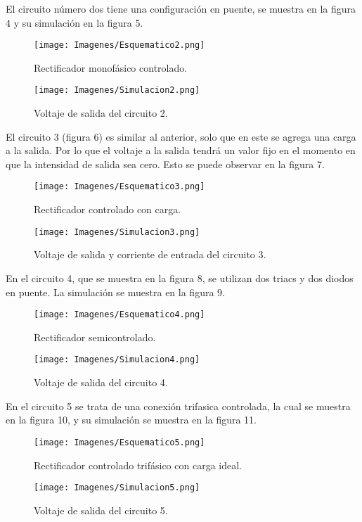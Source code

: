 \documentclass[letterpaper]{article}
\begin{document}
\newpage
El circuito número dos tiene una configuración en puente, se muestra en la figura 4 y su simulación en la figura 5.
\begin{figure}[ht]
    \centering
    \texttt{[image: Imagenes/Esquematico2.png]}
    \caption{Rectificador monofásico controlado.}
    \label{fig:my_label2}
\end{figure}
\begin{figure}[ht]
    \centering
    \texttt{[image: Imagenes/Simulacion2.png]}
    \caption{Voltaje de salida del circuito 2.}
    \label{fig:my_label3}
\end{figure}

\newpage
El circuito 3 (figura 6) es similar al anterior, solo que en este se agrega una carga a la salida. Por lo que el voltaje a la salida tendrá un valor fijo en el momento en que la intensidad de salida sea cero. Esto se puede observar en la figura 7.
\begin{figure}[ht]
    \centering
    \texttt{[image: Imagenes/Esquematico3.png]}
    \caption{Rectificador controlado con carga.}
    \label{fig:my_label4}
\end{figure}
\begin{figure}[ht]
    \centering
    \texttt{[image: Imagenes/Simulacion3.png]}
    \caption{Voltaje de salida y corriente de entrada del circuito 3.}
    \label{fig:my_label5}
\end{figure}

\newpage
En el circuito 4, que se muestra en la figura 8, se utilizan dos triacs y dos diodos en puente. La simulación se muestra en la figura 9.
\begin{figure}[ht]
    \centering
    \texttt{[image: Imagenes/Esquematico4.png]}
    \caption{Rectificador semicontrolado.}
    \label{fig:my_label6}
\end{figure}
\begin{figure}[ht]
    \centering
    \texttt{[image: Imagenes/Simulacion4.png]}
    \caption{Voltaje de salida del circuito 4.}
    \label{fig:my_label7}
\end{figure}

\newpage
En el circuito 5 se trata de una conexión trifasica controlada, la cual se muestra en la figura 10, y su simulación se muestra en la figura 11.
\begin{figure}[ht]
    \centering
    \texttt{[image: Imagenes/Esquematico5.png]}
    \caption{Rectificador controlado trifásico con carga ideal.}
    \label{fig:my_label8}
\end{figure}
\begin{figure}[ht]
    \centering
    \texttt{[image: Imagenes/Simulacion5.png]}
    \caption{Voltaje de salida del circuito 5.}
    \label{fig:my_label9}
\end{figure}
\end{document}
